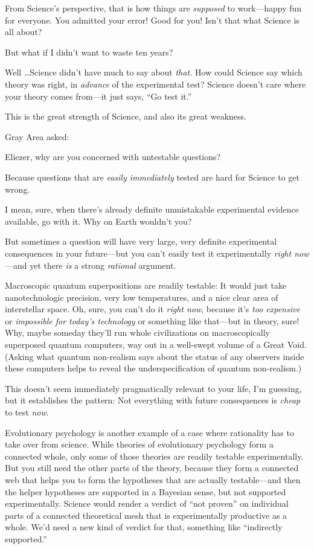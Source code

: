 {
 From Science's perspective, that is how things are
\textit{supposed} to work---happy fun for everyone. You admitted your
error! Good for you! Isn't that what Science is all
about?}

{
 But what if I didn't want to waste ten years?}

{
 Well \ldots Science didn't have much to say about
\textit{that.} How could Science say which theory was right, in
\textit{advance} of the experimental test? Science
doesn't care where your theory comes from---it just
says, ``Go test it.''}

{
 This is the great strength of Science, and also its great
weakness.}

{
 Gray Area asked:}

{
 Eliezer, why are you concerned with untestable questions?}

{
 Because questions that are \textit{easily immediately} tested are
hard for Science to get wrong.}

{
 I mean, sure, when there's already definite
unmistakable experimental evidence available, go with it. Why on Earth
wouldn't you?}

{
 But sometimes a question will have very large, very definite
experimental consequences in your future---but you
can't easily test it experimentally \textit{right
now}{}---and yet there \textit{is} a strong \textit{rational}
argument.}

{
 Macroscopic quantum superpositions are readily testable: It would
just take nanotechnologic precision, very low temperatures, and a nice
clear area of interstellar space. Oh, sure, you can't
do it \textit{right now}, because it's \textit{too
expensive} or \textit{impossible for today's
technology} or something like that---but in theory, sure! Why, maybe
someday they'll run whole civilizations on
macroscopically superposed quantum computers, way out in a well-swept
volume of a Great Void. (Asking what quantum non-realism says about the
status of any observers inside these computers helps to reveal the
underspecification of quantum non-realism.)}

{
 This doesn't seem immediately pragmatically
relevant to your life, I'm guessing, but it establishes
the pattern: Not everything with future consequences is \textit{cheap}
to test \textit{now}.}

{
 Evolutionary psychology is another example of a case where
rationality has to take over from science. While theories of
evolutionary psychology form a connected whole, only some of those
theories are readily testable experimentally. But you still need the
other parts of the theory, because they form a connected web that helps
you to form the hypotheses that are actually testable---and then the
helper hypotheses are supported in a Bayesian sense, but not supported
experimentally. Science would render a verdict of
``not proven'' on individual parts
of a connected theoretical mesh that is experimentally productive as a
whole. We'd need a new kind of verdict for that,
something like ``indirectly
supported.''}

